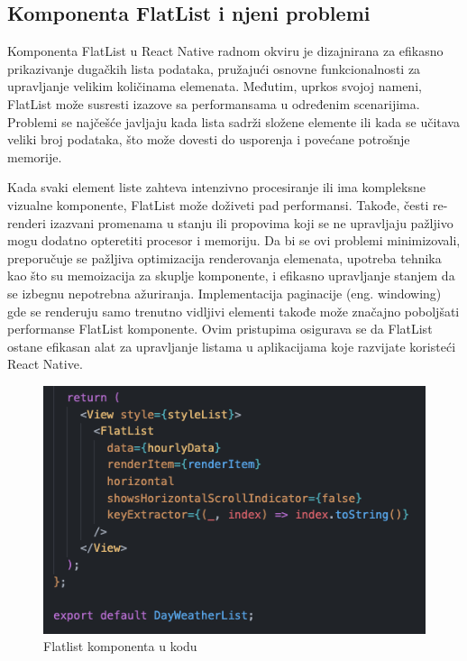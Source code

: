 \documentclass[12pt,oneside]{memoir}
\begin{document}
\subsection{Komponenta FlatList i njeni problemi}

Komponenta FlatList u React Native radnom okviru je dizajnirana za efikasno prikazivanje dugačkih lista podataka, pružajući osnovne funkcionalnosti za upravljanje velikim količinama elemenata. Međutim, uprkos svojoj nameni, FlatList može susresti izazove sa performansama u određenim scenarijima. Problemi se najčešće javljaju kada lista sadrži složene elemente ili kada se učitava veliki broj podataka, što može dovesti do usporenja i povećane potrošnje memorije.

Kada svaki element liste zahteva intenzivno procesiranje ili ima kompleksne vizualne komponente, FlatList može doživeti pad performansi. Takođe, česti re-renderi izazvani promenama u stanju ili propovima koji se ne upravljaju pažljivo mogu dodatno opteretiti procesor i memoriju. Da bi se ovi problemi minimizovali, preporučuje se pažljiva optimizacija renderovanja elemenata, upotreba tehnika kao što su memoizacija za skuplje komponente, i efikasno upravljanje stanjem da se izbegnu nepotrebna ažuriranja. Implementacija paginacije (eng. windowing) gde se renderuju samo trenutno vidljivi elementi takođe može značajno poboljšati performanse FlatList komponente. Ovim pristupima osigurava se da FlatList ostane efikasan alat za upravljanje listama u aplikacijama koje razvijate koristeći React Native.

\begin{figure}[h!]
    \centering
    \includegraphics[scale=0.5]{docs/images/chapterFive/flatlistExample.png}
    \caption{Flatlist komponenta u kodu}
    \label{fig:flatListExample1}
\end{figure}
\end{document}
